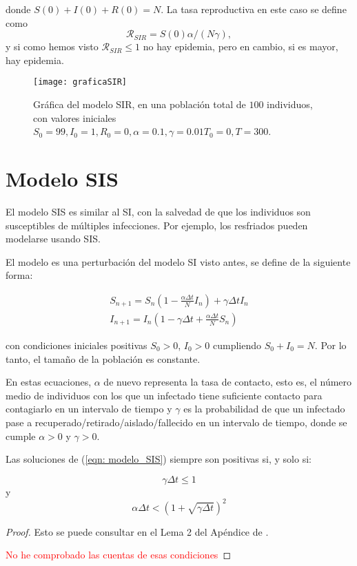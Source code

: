donde $S(0)+I(0)+R(0)=N$. La tasa reproductiva en este caso se define como
$$\mathcal{R}_{SIR}=S(0)\alpha /(N\gamma ),$$
y si como hemos visto $\mathcal{R}_{SIR}\leq 1$  no hay epidemia, pero en cambio, si es mayor, hay epidemia.

\begin{figure}
\begin{center}
\caption{Gráfica del modelo SIR, en una población total de $100$ individuos, con valores iniciales $S_0=99, I_0 = 1, R_0 = 0, \alpha = 0.1, \gamma = 0.01 T_0 = 0, T = 300$.}
\texttt{[image: graficaSIR]}
\end{center}
\end{figure}


\section{Modelo SIS}
El modelo SIS es similar al SI, con la salvedad de que los individuos son susceptibles de múltiples infecciones.
Por ejemplo, los resfriados pueden modelarse usando SIS.

El modelo es una perturbación del modelo SI visto antes, se define de la siguiente forma:

\begin{equation}
\label{eqn: modelo_SIS}
\begin{aligned}
S_{n+1} = S_n \left(1-\frac{\alpha\Delta t}{N} I_n \right) + \gamma \Delta t I_n \\
I_{n+1} = I_n \left( 1-\gamma \Delta t + \frac{\alpha\Delta t}{N} S_n \right)
\end{aligned}
\end{equation}

con condiciones iniciales positivas $S_0>0$, $I_0>0$ cumpliendo $S_0+I_0=N$. Por lo tanto, el tamaño de la población es constante.

En estas ecuaciones, $\alpha$ de nuevo representa la tasa de contacto, esto es, el número medio de individuos con los que un infectado tiene suficiente contacto para contagiarlo en un intervalo de tiempo y $\gamma$ es la probabilidad de que un infectado pase a recuperado/retirado/aislado/fallecido en un intervalo de tiempo, donde se cumple $\alpha >0$ y $\gamma >0$.

\begin{proposition}
Las soluciones de (\ref{eqn: modelo_SIS}) siempre son positivas si, y solo si:

$$\gamma \Delta t \leq 1 $$ y $$\alpha\Delta t< \left( 1+\sqrt{\gamma \Delta t} \right)^2$$

\end{proposition}
\begin{proof}
Esto se puede consultar en el Lema 2 del Apéndice de \cite{allenDiscretetimeSISIR1994}.

\textcolor{red}{No he comprobado las cuentas de esas condiciones}
\end{proof}


